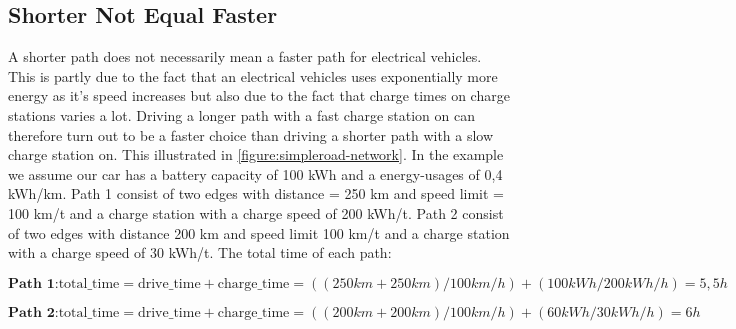 \subsection{Shorter Not Equal Faster}

A shorter path does not necessarily mean a faster path for electrical vehicles. 
This is partly due to the fact that an electrical vehicles uses exponentially more energy 
as it's speed increases but also due to the fact that charge times on charge stations
varies a lot. Driving a longer path with a fast charge station on can therefore turn out to
be a faster choice than driving a shorter path with a slow charge station on. This illustrated 
in \ref{figure:simpleroad-network}. In the example we assume our car has a battery capacity of 100 kWh and a energy-usages of
0,4 kWh/km. Path 1 consist of two edges with distance = 250 km and speed limit = 100 km/t
and a charge station with a charge speed of 200 kWh/t. Path 2 consist of two edges with
distance 200 km and speed limit 100 km/t and a charge station with a charge speed of 30 kWh/t.
The total time of each path:

\[\textbf{Path 1:} \text{total\_time} = \text{drive\_time} + \text{charge\_time} = 
				((250 km + 250 km) / 100 km/h) + (100 kWh / 200 kWh/h) = 5,5 h\]

\[\textbf{Path 2:} \text{total\_time} = \text{drive\_time} + \text{charge\_time} = 
				((200 km + 200 km) / 100 km/h) + (60 kWh / 30 kWh/h) = 6 h\]